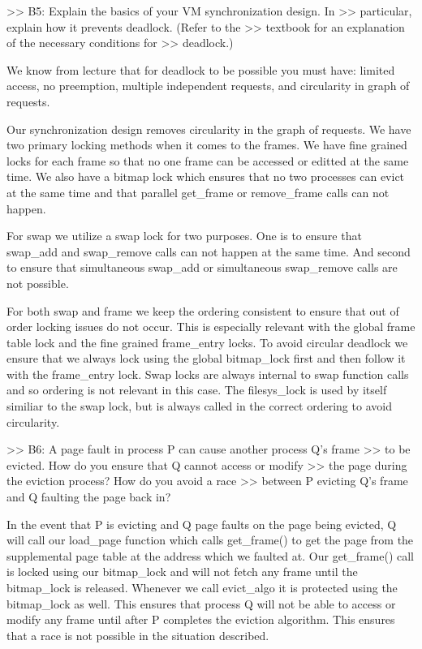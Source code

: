 >> B5: Explain the basics of your VM synchronization design.  In
>> particular, explain how it prevents deadlock.  (Refer to the
>> textbook for an explanation of the necessary conditions for
>> deadlock.)

We know from lecture that for deadlock to be possible you must have: limited 
access, no preemption, multiple independent requests, and circularity in 
graph of requests. 

Our synchronization design removes circularity in the graph of requests.
We have two primary locking methods when it comes to the frames. We have
fine grained locks for each frame so that no one frame can be accessed
or editted at the same time. We also have a bitmap lock which ensures that
no two processes can evict at the same time and that parallel get_frame
or remove_frame calls can not happen. 

For swap we utilize a swap lock for two purposes. One is to ensure that
swap_add and swap_remove calls can not happen at the same time. And second
to ensure that simultaneous swap_add or simultaneous swap_remove calls
are not possible. 

For both swap and frame we keep the ordering consistent
to ensure that out of order locking issues do not occur. This
is especially relevant with the global frame table lock and the
fine grained frame_entry locks. To avoid circular deadlock we ensure
that we always lock using the global bitmap_lock first and then
follow it with the frame_entry lock. Swap locks are always internal to
swap function calls and so ordering is not relevant in this case. 
The filesys_lock is used by itself similiar to the swap lock, but is
always called in the correct ordering to avoid circularity.

>> B6: A page fault in process P can cause another process Q's frame
>> to be evicted.  How do you ensure that Q cannot access or modify
>> the page during the eviction process?  How do you avoid a race
>> between P evicting Q's frame and Q faulting the page back in?

In the event that P is evicting and Q page faults on the page being evicted,
Q will call our load_page function which calls get_frame() to get the page
from the supplemental page table at the address which we faulted at. 
Our get_frame() call is locked using our bitmap_lock and will not fetch 
any frame until the bitmap_lock is released. Whenever we call evict_algo 
it is protected using the bitmap_lock as well. This ensures that process 
Q will not be able to access or modify any frame until after P completes 
the eviction algorithm. This ensures that a race is not possible
in the situation described.

